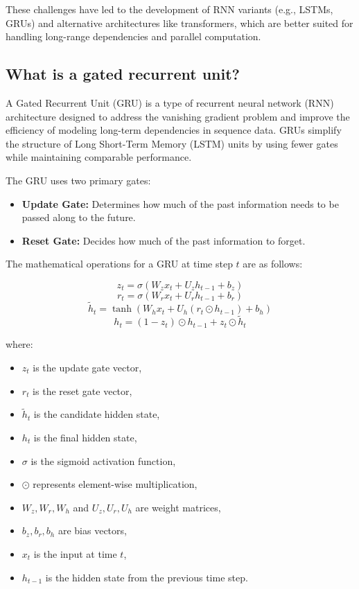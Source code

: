 These challenges have led to the development of RNN variants (e.g., LSTMs, GRUs) and alternative architectures like transformers, which are better suited for handling long-range dependencies and parallel computation.

\subsection{What is a gated recurrent unit?}

A Gated Recurrent Unit (GRU) is a type of recurrent neural network (RNN) architecture designed to address the vanishing gradient problem and improve the efficiency of modeling long-term dependencies in sequence data. GRUs simplify the structure of Long Short-Term Memory (LSTM) units by using fewer gates while maintaining comparable performance.

The GRU uses two primary gates:

\begin{itemize}
    \item \textbf{Update Gate:} Determines how much of the past information needs to be passed along to the future.
    \item \textbf{Reset Gate:} Decides how much of the past information to forget.
\end{itemize}

The mathematical operations for a GRU at time step \( t \) are as follows:

\[
z_t = \sigma(W_z x_t + U_z h_{t-1} + b_z)
\]
\[
r_t = \sigma(W_r x_t + U_r h_{t-1} + b_r)
\]
\[
\tilde{h}_t = \tanh(W_h x_t + U_h (r_t \odot h_{t-1}) + b_h)
\]
\[
h_t = (1 - z_t) \odot h_{t-1} + z_t \odot \tilde{h}_t
\]

where:
\begin{itemize}
    \item \( z_t \) is the update gate vector,
    \item \( r_t \) is the reset gate vector,
    \item \( \tilde{h}_t \) is the candidate hidden state,
    \item \( h_t \) is the final hidden state,
    \item \( \sigma \) is the sigmoid activation function,
    \item \( \odot \) represents element-wise multiplication,
    \item \( W_z, W_r, W_h \) and \( U_z, U_r, U_h \) are weight matrices,
    \item \( b_z, b_r, b_h \) are bias vectors,
    \item \( x_t \) is the input at time \( t \),
    \item \( h_{t-1} \) is the hidden state from the previous time step.
\end{itemize}

